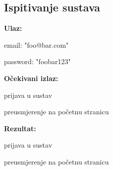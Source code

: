 			\subsection{Ispitivanje sustava}
			 
			 \noindent {}
			 \begin{packed_item}

				 \item \textbf{Ulaz:}

				 \item[] \begin{packed_enum}
					\item email: "foo@bar.com"
					\item password: "foobar123"
				\end{packed_enum}

				  \item \textbf{Očekivani izlaz:}

				 \item[] \begin{packed_enum}
					\item prijava u sustav
					\item preusmjerenje na početnu stranicu
				\end{packed_enum}
				 
				\item \textbf{Rezultat:}

				\item[] \begin{packed_enum}
					\item prijava u sustav
					\item preusmjerenje na početnu stranicu
			   \end{packed_enum}

			 \end{packed_item}

